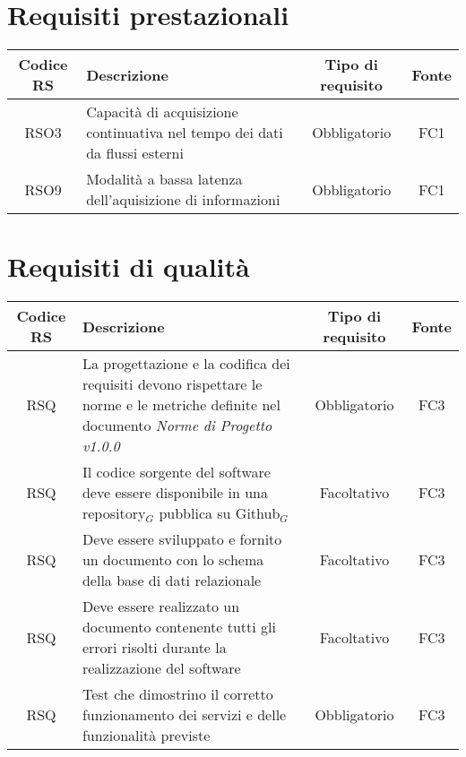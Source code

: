 {\section{Requisiti prestazionali}
\begin{center}
	\renewcommand{\arraystretch}{1.4}
	\begin{tabularx}{\textwidth}{ |c|X|c|c| }
		\hline
		\rowcolor{Melon}
		\textbf{Codice RS} & \textbf{Descrizione} & \textbf{Tipo di requisito} & \textbf{Fonte} \\
		\hline
		RSO3 & Capacità di acquisizione continuativa nel tempo dei dati da flussi esterni & Obbligatorio & FC1   \\
		\hline
		RSO9 & Modalità a bassa latenza dell'aquisizione di informazioni & Obbligatorio & FC1 \\

	\end{tabularx}
\end{center}

\section{Requisiti di qualità}
\begin{center}
	\renewcommand{\arraystretch}{1.4}
	\begin{tabularx}{\textwidth}{ |c|X|c|c| }
		\hline
		\rowcolor{Melon}
		\textbf{Codice RS} & \textbf{Descrizione} & \textbf{Tipo di requisito} & \textbf{Fonte} \\
		\hline
		RSQ  & La progettazione e la codifica dei requisiti devono rispettare le norme e le metriche definite nel documento \textit{Norme di Progetto v1.0.0}& Obbligatorio & FC3 \\
		\hline
	RSQ  & Il codice sorgente del software deve essere disponibile in una repository$_G$ pubblica su Github$_G$  & Facoltativo & FC3 \\
	\hline
	RSQ  & Deve essere sviluppato e fornito un documento con lo schema della base di dati relazionale  & Facoltativo & FC3 \\
	\hline
	RSQ  & Deve essere realizzato un documento contenente tutti gli errori risolti durante la realizzazione del software & Facoltativo & FC3 \\
		\hline
	RSQ  & Test che dimostrino il corretto funzionamento dei servizi e delle funzionalità previste  & Obbligatorio & FC3 \\
	\hline
	\end{tabularx}
\end{center}


}
